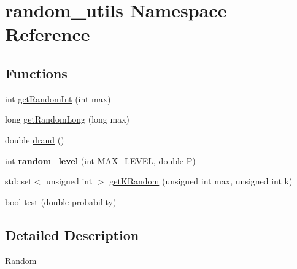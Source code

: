 \hypertarget{namespacerandom__utils}{\section{random\+\_\+utils Namespace Reference}
\label{namespacerandom__utils}
}
\subsection*{Functions}
\begin{DoxyCompactItemize}
\item 
int \hyperlink{namespacerandom__utils_a963d6ef263fdba4e610ebcee4f032160}{get\+Random\+Int} (int max)
\item 
long \hyperlink{namespacerandom__utils_aacf1cf7263637e2521053fbb2f4c9c3b}{get\+Random\+Long} (long max)
\item 
double \hyperlink{namespacerandom__utils_a83df31345567a4ff6f6944d15820c599}{drand} ()
\item 
\hypertarget{namespacerandom__utils_a81e19637c97cb8940d8c3eef8a570a69}{int {\bfseries random\+\_\+level} (int M\+A\+X\+\_\+\+L\+E\+V\+E\+L, double P)}\label{namespacerandom__utils_a81e19637c97cb8940d8c3eef8a570a69}

\item 
std\+::set$<$ unsigned int $>$ \hyperlink{namespacerandom__utils_afb0b7989da5f1f74778d801d690ac89b}{get\+K\+Random} (unsigned int max, unsigned int k)
\item 
bool \hyperlink{namespacerandom__utils_a69e3016d19317aee7f00041e01021894}{test} (double probability)
\end{DoxyCompactItemize}


\subsection{Detailed Description}
Random 

